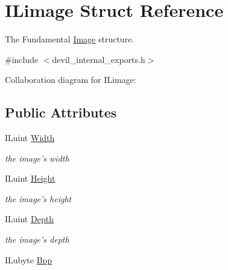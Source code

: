 \hypertarget{struct_i_limage}{\section{I\+Limage Struct Reference}
\label{struct_i_limage}
}


The Fundamental \hyperlink{class_image}{Image} structure.  




{\ttfamily \#include $<$devil\+\_\+internal\+\_\+exports.\+h$>$}



Collaboration diagram for I\+Limage\+:
\subsection*{Public Attributes}
\begin{DoxyCompactItemize}
\item 
\hypertarget{struct_i_limage_acdaccde79cda12c44c7a076ef9978cf1}{I\+Luint \hyperlink{struct_i_limage_acdaccde79cda12c44c7a076ef9978cf1}{Width}}\label{struct_i_limage_acdaccde79cda12c44c7a076ef9978cf1}

\begin{DoxyCompactList}\small\item\em the image's width \end{DoxyCompactList}\item 
\hypertarget{struct_i_limage_af0fe112b929d774c723ba5d8b6c2c5da}{I\+Luint \hyperlink{struct_i_limage_af0fe112b929d774c723ba5d8b6c2c5da}{Height}}\label{struct_i_limage_af0fe112b929d774c723ba5d8b6c2c5da}

\begin{DoxyCompactList}\small\item\em the image's height \end{DoxyCompactList}\item 
\hypertarget{struct_i_limage_a00e19fb6f1e50731d114c302129112d9}{I\+Luint \hyperlink{struct_i_limage_a00e19fb6f1e50731d114c302129112d9}{Depth}}\label{struct_i_limage_a00e19fb6f1e50731d114c302129112d9}

\begin{DoxyCompactList}\small\item\em the image's depth \end{DoxyCompactList}\item 
\hypertarget{struct_i_limage_a1b3ec86e5bf7087b7d46f0ed61d86eb9}{I\+Lubyte \hyperlink{struct_i_limage_a1b3ec86e5bf7087b7d46f0ed61d86eb9}{Bpp}}\label{struct_i_limage_a1b3ec86e5bf7087b7d46f0ed61d86eb9}


\end{DoxyCompactItemize}

